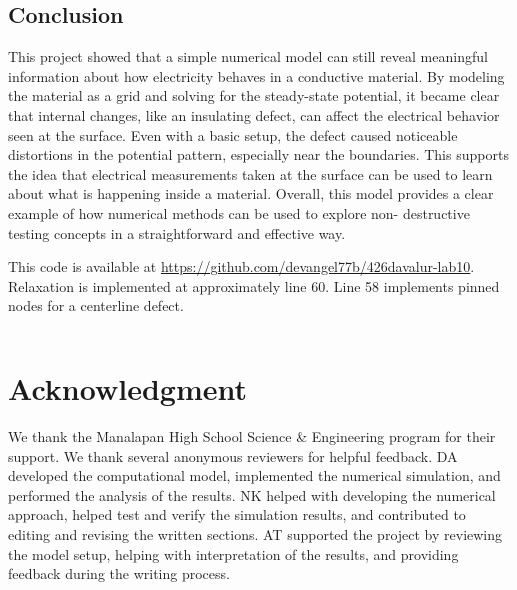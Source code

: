 \documentclass[10pt,journal,twoside]{IEEEtran} %
\begin{document}
\subsection{Conclusion}
This project showed that a simple numerical model can still reveal meaningful information about how electricity behaves in a conductive material. By modeling the material as a grid and solving for the steady-state potential, it became clear that internal changes, like an insulating defect, can affect the electrical behavior seen at the surface. Even with a basic setup, the defect caused noticeable distortions in the potential pattern, especially near the boundaries. This supports the idea that electrical measurements taken at the surface can be used to learn about what is happening inside a material. Overall, this model provides a clear example of how numerical methods can be used to explore non- destructive testing concepts in a straightforward and effective way.





\appendix
This code is available at \url{https://github.com/devangel77b/426davalur-lab10}. Relaxation is implemented at approximately line 60. Line 58 implements pinned nodes for a centerline defect. 
\inputminted{python}{code/main.py}








\section*{Acknowledgment}
We thank the Manalapan High School Science \& Engineering program for their support. We thank several anonymous reviewers for helpful feedback. DA developed the computational model, implemented the numerical simulation, and performed the analysis of the results. NK helped with developing the numerical approach, helped test and verify the simulation results, and contributed to editing and revising the written sections. AT supported the project by reviewing the model setup, helping with interpretation of the results, and providing feedback during the writing process.
\end{document}
